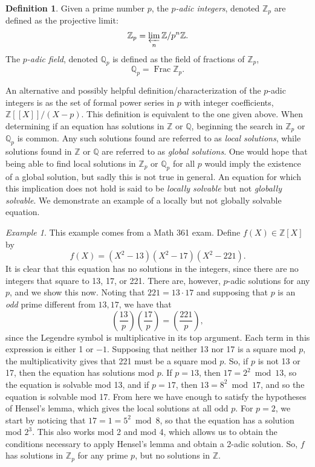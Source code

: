\documentclass[12pt,twoside]{reedthesis}
\theoremstyle{plain}
\theoremstyle{definition}
\newtheorem{definition}{Definition}[section]
\theoremstyle{remark}
\newtheorem{example}{Example}[section]
\newcommand{\ZZ}{\mathbb{Z}}
\newcommand{\QQ}{\mathbb{Q}}
\newcommand{\Frac}{\operatorname{Frac}}
\begin{document}
\begin{definition}
Given a prime number $p$, the \emph{$p$-adic integers}, denoted $\ZZ_p$ are defined as the projective limit:\[\ZZ_p=\varprojlim_n\ZZ/p^n\ZZ.\] The \emph{$p$-adic field}, denoted $\QQ_p$ is defined as the field of fractions of $\ZZ_p$, \[\QQ_p=\Frac\ZZ_p.\]
\end{definition} 
An alternative and possibly helpful definition/characterization of the $p$-adic integers is as the set of formal power series in $p$ with integer coefficients, $\ZZ[[X]]/(X-p)$. This definition is equivalent to the one given above. 
When determining if an equation has solutions in $\ZZ$ or $\QQ$, beginning the search in $\ZZ_p$ or $\QQ_p$ is common. Any such solutions found are referred to as \emph{local solutions}, while solutions found in $\ZZ$ or $\QQ$ are referred to as \emph{global solutions}. One would hope that being able to find local solutions in $\ZZ_p$ or $\QQ_p$ for all $p$ would imply the existence of a global solution, but sadly this is not true in general. An equation for which this implication does not hold is said to be \emph{locally solvable} but not \emph{globally solvable}. We demonstrate an example of a locally but not globally solvable equation.

\begin{example}
This example comes from a Math 361 exam. Define $f(X)\in\ZZ[X]$ by \[f(X)=(X^2-13)(X^2-17)(X^2-221).\] It is clear that this equation has no solutions in the integers, since there are no integers that square to 13, 17, or 221. There are, however, $p$-adic solutions for any $p$, and we show this now. Noting that $221=13\cdot 17$ and supposing that $p$ is an \emph{odd} prime different from $13,17$, we have that \[\left(\frac{13}{p}\right)\left(\frac{17}{p}\right)=\left(\frac{221}{p}\right),\] since the Legendre symbol is multiplicative in its top argument. Each term in this expression is either 1 or $-1$. Supposing that neither 13 nor 17 is a square mod $p$, the multiplicativity gives that 221 must be a square mod $p$. So, if $p$ is not 13 or 17, then the equation has solutions mod $p$. If $p=13$, then $17=2^2\bmod13$, so the equation is solvable mod 13, and if $p=17$, then $13=8^2\bmod17$, and so the equation is solvable mod 17. From here we have enough to satisfy the hypotheses of Hensel's lemma, which gives the local solutions at all odd $p$. For $p=2$, we start by noticing that $17=1=5^2\bmod 8$, so that the equation has a solution mod $2^3$. This also works mod 2 and mod 4, which allows us to obtain the conditions necessary to apply Hensel's lemma and obtain a 2-adic solution. So, $f$ has solutions in $\ZZ_p$ for any prime $p$, but no solutions in $\ZZ$.
\end{example}
\end{document}
